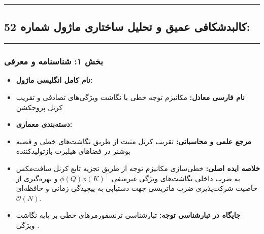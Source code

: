 \clearpage
{}
\vspace*{0.2cm}
\noindent\rule{\textwidth}{1.2pt}\vspace{-0.2cm}
\subsection{کالبدشکافی عمیق و تحلیل ساختاری ماژول شماره 52: }
\label{sec:fast_attention}
\vspace{-0.2cm}\noindent\rule{\textwidth}{0.5pt}
\vspace{0.4cm}
\subsubsection*{بخش ۱: شناسنامه و معرفی }
\begin{itemize}
    \item \textbf{نام کامل انگلیسی ماژول:} 
    \item \textbf{نام فارسی معادل:} مکانیزم توجه خطی با نگاشت ویژگی‌های تصادفی و تقریب کرنل پروجکشن 
    \item \textbf{دسته‌بندی معماری:} 
    \item \textbf{مرجع علمی و محاسباتی:} تقریب کرنل مثبت از طریق نگاشت‌های خطی و قضیه بوشنر در فضاهای هیلبرت بازتولیدکننده 
    \item \textbf{خلاصه ایده اصلی:} خطی‌سازی مکانیزم توجه از طریق تجزیه تابع کرنل سافت‌مکس به ضرب داخلی نگاشت‌های ویژگی غیرمنفی $\phi(Q) \phi(K)^\top$ و بهره‌گیری از خاصیت شرکت‌پذیری ضرب ماتریسی جهت دستیابی به پیچیدگی زمانی و حافظه‌ای $\mathcal{O}(N)$.
    \item \textbf{جایگاه در تبارشناسی توجه:} تبارشناسی ترنسفورمرهای خطی بر پایه نگاشت ویژگی .
\end{itemize}

